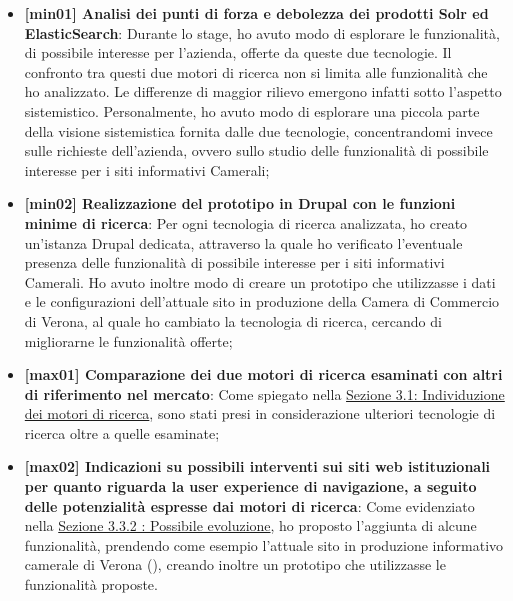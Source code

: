 	\begin{itemize}
		
		\item {\textbf{[min01] Analisi dei punti di forza e debolezza dei prodotti \gls{Solr} ed \gls{ElasticSearch}}: Durante lo stage, ho avuto modo di esplorare le funzionalità, di possibile interesse per l'azienda, offerte da queste due tecnologie. Il confronto tra questi due motori di ricerca non si limita alle funzionalità che ho analizzato. Le differenze di maggior rilievo emergono infatti sotto l'aspetto sistemistico. Personalmente, ho avuto modo di esplorare una piccola parte della visione sistemistica fornita dalle due tecnologie, concentrandomi invece sulle richieste dell'azienda, ovvero sullo studio delle funzionalità di possibile interesse per i siti informativi Camerali;}
		
		\item {\textbf{[min02] Realizzazione del prototipo in \gls{Drupal} con le funzioni minime di ricerca}: Per ogni tecnologia di ricerca analizzata, ho creato un'istanza \gls{Drupal} dedicata, attraverso la quale ho verificato l'eventuale presenza delle funzionalità di possibile interesse per i siti informativi Camerali. Ho avuto inoltre modo di creare un prototipo che utilizzasse i dati e le configurazioni dell'attuale sito in produzione della Camera di Commercio di Verona, al quale ho cambiato la tecnologia di ricerca, cercando di migliorarne le funzionalità offerte;}
		
		\item {\textbf{[max01] Comparazione dei due motori di ricerca esaminati con altri di riferimento nel mercato}: Come spiegato nella \hyperref[sec:individuazione_dei_motori_di_ricerca]{Sezione 3.1: Individuzione dei motori di ricerca}, sono stati presi in considerazione ulteriori tecnologie di ricerca oltre a quelle esaminate;}
		
		\item {\textbf{[max02] Indicazioni su possibili interventi sui siti web istituzionali per quanto riguarda la user experience di navigazione, a seguito delle potenzialità espresse dai motori di ricerca}: Come evidenziato nella \hyperref[sub:possibile_evoluzione]{Sezione 3.3.2 : Possibile evoluzione}, ho proposto l'aggiunta di alcune funzionalità, prendendo come esempio l'attuale sito in produzione informativo camerale di Verona (\cite{site:vr}), creando inoltre un prototipo che utilizzasse le funzionalità proposte.}
	\end{itemize}

